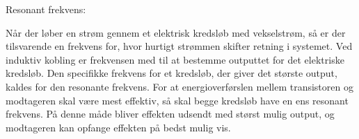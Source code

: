 Resonant frekvens:

Når der løber en strøm gennem et elektrisk kredsløb med vekselstrøm, så er der tilsvarende en frekvens for, hvor hurtigt strømmen skifter retning i systemet. Ved induktiv kobling er frekvensen med til at bestemme outputtet for det elektriske kredsløb. Den specifikke frekvens for et kredsløb, der giver det største output, kaldes for den resonante frekvens. For at energioverførslen mellem transistoren og modtageren skal være mest effektiv, så skal begge kredsløb have en ens resonant frekvens. På denne måde bliver effekten udsendt med størst mulig output, og modtageren kan opfange effekten på bedst mulig vis.